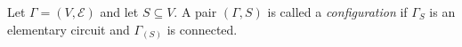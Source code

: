 Let $\Gamma = (V, \mathcal{E})$ and let $S \subseteq V$. A pair $(\Gamma, S)$ is called a \textit{configuration} if $\Gamma_S$ is an elementary circuit and $\Gamma_{(S)}$ is connected.
